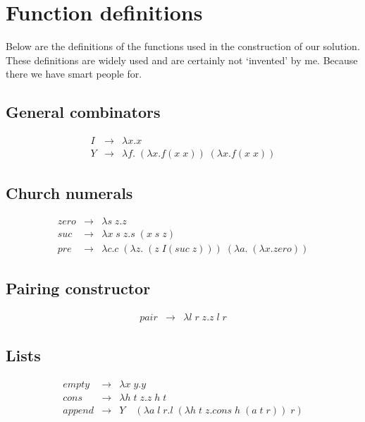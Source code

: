 \documentclass[11pt]{article}
\begin{document}
\appendix

\section{Function definitions}

Below are the definitions of the functions used in the construction of our solution. These definitions are widely used and are certainly not `invented' by me. Because there we have smart people for.

\subsection*{General combinators}

\begin{displaymath}
\begin{array}{rll}
I & \to & \lambda x.x \\
Y & \to & \lambda f. \; (\lambda x.f(x \; x)) \; (\lambda x.f(x \; x))
\end{array}
\end{displaymath}

\subsection*{Church numerals}

\begin{displaymath}
\begin{array}{rll}
zero & \to & \lambda s \; z.z \\
suc & \to & \lambda x \; s \; z.s \; (x \; s \; z) \\
pre & \to & \lambda c.c \; (\lambda z. \; (z \; I (suc \; z))) \; (\lambda a. \; (\lambda x.zero))
\end{array}
\end{displaymath}

\subsection*{Pairing constructor}

\begin{displaymath}
\begin{array}{rll}
pair & \to & \lambda l \; r \; z.z \; l \; r
\end{array}
\end{displaymath}

\subsection*{Lists}

\begin{displaymath}
\begin{array}{rll}
empty & \to & \lambda x \; y.y \\
cons & \to & \lambda h \; t \; z.z \; h \; t \\
append & \to & Y \quad (\lambda a \; l \; r.l \; (\lambda h \; t \; z.cons \; h \; (a \; t \; r)) \; r)
\end{array}
\end{displaymath}
\end{document}
